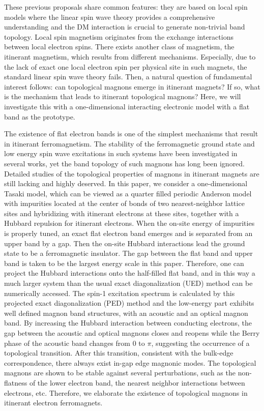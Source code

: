 \documentclass[amsmath,superscriptaddress,showpacs,aps,prb,twocolumn]{revtex4-1}
\begin{document}
\par These previous proposals share common features: they are based on local spin models where the linear spin wave theory provides a comprehensive understanding and the DM interaction is crucial to generate non-trivial band topology. Local spin magnetism originates from the exchange interactions between local electron spins. There exists another class of magnetism, the itinerant magnetism, which results from different mechanisms. Especially, due to the lack of exact one local electron spin per physical site in such magnets, the standard linear spin wave theory fails. Then, a natural question of fundamental interest follows: can topological magnons emerge in itinerant magnets? If so, what is the mechanism that leads to itinerant topological magnons? Here, we will investigate this with a one-dimensional interacting electronic model with a flat band as the prototype.

\par The existence of flat electron bands is one of the simplest mechanisms that result in itinerant ferromagnetism\cite{T_PRL1992,M_PLA1993,MT_CMP1993}. The stability of the ferromagnetic ground state and low energy spin wave excitations in such systems have been investigated in several works\cite{T_PRL1994,KA_PRL1994,DG_PRB2015}, yet the band topology of such magnons has long been ignored. Detailed studies of the topological properties of magnons in itinerant magnets are still lacking and highly deserved. In this paper, we consider a one-dimensional Tasaki model\cite{T_PRL1992,T_PTP1998}, which can be viewed as a quarter filled periodic Anderson model with impurities located at the center of bonds of two nearest-neighbor lattice sites and hybridizing with itinerant electrons at these sites, together with a Hubbard repulsion for itinerant electrons. When the on-site energy of impurities is properly tuned, an exact flat electron band emerges and is separated from an upper band by a gap. Then the on-site Hubbard interactions lead the ground state to be a ferromagnetic insulator. The gap between the flat band and upper band is taken to be the largest energy scale in this paper. Therefore, one can project the Hubbard interactions onto the half-filled flat band\cite{KA_PRL1994,T_PTP1998}, and in this way a much larger system than the usual exact diagonalization (UED) method can be numerically accessed. The spin-1 excitation spectrum is calculated by this projected exact diagonalization (PED) method and the low-energy part exhibits well defined magnon band structures, with an acoustic and an optical magnon band. By increasing the Hubbard interaction between conducting electrons, the gap between the acoustic and optical magnons closes and reopens while the Berry phase of the acoustic band changes from 0 to $\pi$, suggesting the occurrence of a topological transition. After this transition, consistent with the bulk-edge correspondence, there always exist in-gap edge magnonic modes. The topological magnons are shown to be stable against several perturbations, such as the non-flatness of the lower electron band, the nearest neighbor interactions between electrons, etc. Therefore, we elaborate the existence of topological magnons in itinerant electron ferromagnets.
\end{document}
